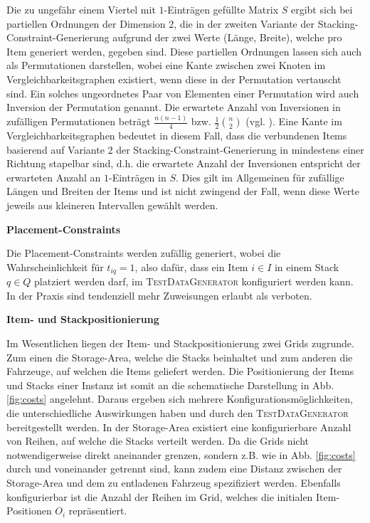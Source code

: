 Die zu ungefähr einem Viertel mit $1$-Einträgen gefüllte Matrix $S$ ergibt sich bei partiellen Ordnungen der Dimension $2$,
die in der zweiten Variante der Stacking-Constraint-Generierung aufgrund der zwei Werte (Länge, Breite),
welche pro Item generiert werden, gegeben sind.
Diese partiellen Ordnungen lassen sich auch als Permutationen darstellen, wobei eine Kante zwischen
zwei Knoten im Vergleichbarkeitsgraphen existiert, wenn diese in der Permutation
vertauscht sind. Ein solches ungeordnetes Paar von Elementen einer Permutation wird auch Inversion
der Permutation genannt. Die erwartete Anzahl von Inversionen in zufälligen Permutationen
beträgt $\frac{n (n - 1)}{4}$ bzw. $\frac{1}{2} \binom{n}{2}$ (vgl. \citet{Heuberger2012}).
Eine Kante im Vergleichbarkeitsgraphen bedeutet in diesem Fall, dass die verbundenen Items
basierend auf Variante 2 der Stacking-Constraint-Generierung in mindestens einer Richtung stapelbar sind,
d.h. die erwartete Anzahl der Inversionen entspricht der erwarteten Anzahl an $1$-Einträgen in $S$.
Dies gilt im Allgemeinen für zufällige Längen und Breiten der Items und ist nicht zwingend der Fall,
wenn diese Werte jeweils aus kleineren Intervallen gewählt werden.\newline

\textbf{Placement-Constraints}

Die Placement-Constraints werden zufällig generiert, wobei die Wahrscheinlichkeit für $t_{iq} = 1$, also dafür,
dass ein Item $i \in I$ in einem Stack $q \in Q$ platziert werden darf, im \textsc{TestDataGenerator} konfiguriert werden kann.
In der Praxis sind tendenziell mehr Zuweisungen erlaubt als verboten.\newline

\textbf{Item- und Stackpositionierung}

Im Wesentlichen liegen der Item- und Stackpositionierung zwei Grids zugrunde. Zum einen die Storage-Area,
welche die Stacks beinhaltet und zum anderen die Fahrzeuge, auf welchen die Items geliefert werden.
Die Positionierung der Items und Stacks einer Instanz ist somit an die schematische Darstellung in Abb. \ref{fig:costs}
angelehnt. Daraus ergeben sich mehrere Konfigurationsmöglichkeiten, die unterschiedliche Auswirkungen haben
und durch den \textsc{TestDataGenerator} bereitgestellt werden.
In der Storage-Area existiert eine konfigurierbare Anzahl von Reihen, auf welche die Stacks verteilt werden.
Da die Grids nicht notwendigerweise direkt aneinander grenzen, sondern z.B. wie in Abb. \ref{fig:costs}
durch  und  voneinander getrennt sind, kann zudem eine Distanz
zwischen der Storage-Area und dem zu entladenen Fahrzeug spezifiziert werden.
Ebenfalls konfigurierbar ist die Anzahl der Reihen im Grid, welches die initialen Item-Positionen $O_i$ repräsentiert.

